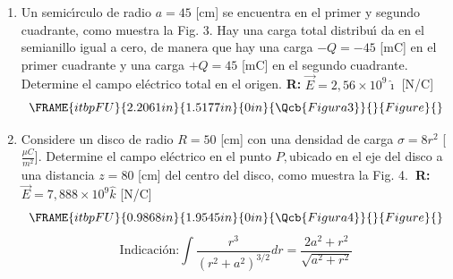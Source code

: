 \documentclass[12pt]{article}
\begin{document}
\begin{enumerate}
\begin{enumerate}
\item Determine el campo el\'{e}ctrico en el punto $P=(1,6,1)$ [m], inducido
por la carga puntual \ \textbf{R: }$\vec{E}=-1155,611\hat{\imath}+770,407%
\hat{\jmath}-770,407\hat{k}$ [N/C]

\item Determine el campo el\'{e}ctrico en el punto $P=(1,6,1)$ [m], inducido
por la distribuci\'{o}n lineal \textbf{R: }$\vec{E}=3672\hat{\jmath}-612\hat{%
k}$ [N/C]

\item El campo el\'{e}ctrico total en el punto $P=(1,6,1)$ [m] \textbf{R: }$%
\vec{E}=-1155,611\hat{\imath}+4442,407\hat{\jmath}-1382,407\hat{k}$ [N/C]

\item Si en ese punto se coloca una carga puntual~$q_{2}=5$ [mC], determine
la fuerza neta ejercida sobre ella. \textbf{R: }$\vec{F}=-5,778\hat{\imath}%
+22,212\hat{\jmath}-6,912\hat{k}$ [N]
\end{enumerate}

\item Un semic\'{\i}rculo de radio $a=45$ [cm] se encuentra en el primer y
segundo cuadrante, como muestra la Fig. 3. Hay una carga total distribu\'{\i}%
da en el semianillo igual a cero, de manera que hay una carga $-Q=-45$ [mC]
en el primer cuadrante y una carga $+Q=45$ [mC] en el segundo cuadrante.
Determine el campo el\'{e}ctrico total en el origen. \textbf{R: }$\vec{E}%
=2,56\times 10^{9}\hat{\imath}$ [N/C] \textbf{\ } 
\begin{equation*}
\FRAME{itbpFU}{2.2061in}{1.5177in}{0in}{\Qcb{Figura 3}}{}{Figure}{\special%
{language "Scientific Word";type "GRAPHIC";maintain-aspect-ratio
TRUE;display "USEDEF";valid_file "T";width 2.2061in;height 1.5177in;depth
0in;original-width 4.8326in;original-height 3.3148in;cropleft "0";croptop
"1";cropright "1";cropbottom "0";tempfilename
'R03JBW03.wmf';tempfile-properties "XPR";}}
\end{equation*}

\item Considere un disco de radio $R=50$ [cm] con una densidad de carga $%
\sigma =8r^{2}$ [$\frac{\mu C}{m^{2}}$]. Determine el campo el\'{e}ctrico en
el punto $P,$ubicado en el eje del disco a una distancia $z=80$ [cm] del
centro del disco, como muestra la Fig. 4.\textbf{\ R: }$\vec{E}=7,888\times
10^{9}\hat{k}$ [N/C] 
\begin{equation*}
\FRAME{itbpFU}{0.9868in}{1.9545in}{0in}{\Qcb{Figura 4}}{}{Figure}{\special%
{language "Scientific Word";type "GRAPHIC";maintain-aspect-ratio
TRUE;display "USEDEF";valid_file "T";width 0.9868in;height 1.9545in;depth
0in;original-width 1.9899in;original-height 3.9686in;cropleft "0";croptop
"1";cropright "1";cropbottom "0";tempfilename
'R03JBW04.wmf';tempfile-properties "XPR";}}
\end{equation*}%
\begin{equation*}
\text{Indicaci\'{o}n:}\int \frac{r^{3}}{\left( r^{2}+a^{2}\right) ^{3/2}}dr=%
\frac{2a^{2}+r^{2}}{\sqrt{a^{2}+r^{2}}}
\end{equation*}
\end{enumerate}
\end{document}
